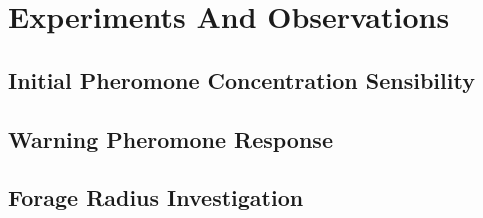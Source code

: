 \chapter{Experiments And Observations}
\label{ch:experiments-and-observations}

\section{Initial Pheromone Concentration Sensibility}
\section{Warning Pheromone Response}
\section{Forage Radius Investigation}